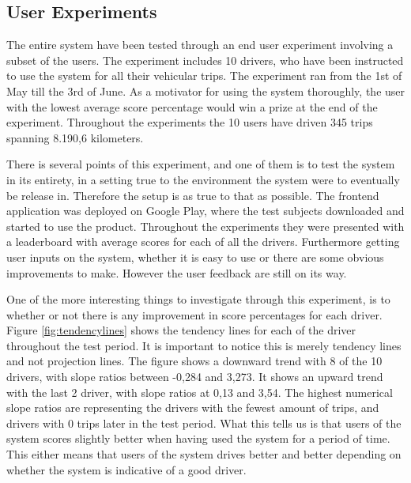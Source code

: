 \subsection{User Experiments}\label{subsec:userexp}

The entire system have been tested through an end user experiment involving a subset of the users. The experiment includes 10 drivers, who have been instructed to use the system for all their vehicular trips. The experiment ran from the 1st of May till the 3rd of June. As a motivator for using the system thoroughly, the user with the lowest average score percentage would win a prize at the end of the experiment. Throughout the experiments the 10 users have driven 345 trips spanning 8.190,6 kilometers.

There is several points of this experiment, and one of them is to test the system in its entirety, in a setting true to the environment the system were to eventually be release in. Therefore the setup is as true to that as possible. The frontend application was deployed on Google Play, where the test subjects downloaded and started to use the product. Throughout the experiments they were presented with a leaderboard with average scores for each of all the drivers. 
Furthermore getting user inputs on the system, whether it is easy to use or there are some obvious improvements to make. However the user feedback are still on its way.

One of the more interesting things to investigate through this experiment, is to whether or not there is any improvement in score percentages for each driver. Figure \ref{fig:tendencylines} shows the tendency lines for each of the driver throughout the test period. It is important to notice this is merely tendency lines and not projection lines. The figure shows a downward trend with 8 of the 10 drivers, with  slope ratios between -0,284 and 3,273. It shows an upward trend with the last 2 driver, with slope ratios at 0,13 and 3,54. The highest numerical slope ratios are representing the drivers with the fewest amount of trips, and drivers with 0 trips later in the test period. What this tells us is that users of the system scores slightly better when having used the system for a period of time. This either means that users of the system drives better and better depending on whether the system is indicative of a good driver.


